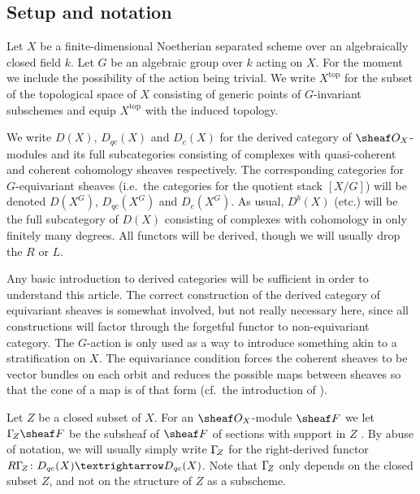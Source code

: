 \documentclass[english,biblatex-alpha]{short-notes}
\newcommand\lc[1]{\Gamma_{\mkern-3mu#1}}
\begin{document}
\subsection{Setup and notation}

Let $X$ be a finite-dimensional Noetherian separated scheme over an algebraically closed field $k$.
Let $G$ be an algebraic group over $k$ acting on $X$.
For the moment we include the possibility of the action being trivial.
We write $X^{\mathrm{top}}$ for the subset of the topological space of $X$ consisting of generic points of $G$-invariant subschemes and equip $X^{\mathrm{top}}$ with the induced topology.

We write $D(X)$, $D_{qc}(X)$ and $D_c(X)$ for the derived category of $\O_X$-modules and its full subcategories consisting of complexes with quasi-coherent and coherent cohomology sheaves respectively.
The corresponding categories for $G$-equivariant sheaves (i.e.\ the categories for the quotient stack $[X/G]$) will be denoted $D(X^G)$, $D_{qc}(X^G)$ and $D_c(X^G)$.
As usual, $D^b(X)$ (etc.) will be the full subcategory of $D(X)$ consisting of complexes with cohomology in only finitely many degrees.
All functors will be derived, though we will usually drop the $R$ or $L$.

\begin{cgs}
    Any basic introduction to derived categories will be sufficient in order to understand this article.
    The correct construction of the derived category of equivariant sheaves is somewhat involved, but not really necessary here, since all constructions will factor through the forgetful functor to non-equivariant category.
    The $G$-action is only used as a way to introduce something akin to a stratification on $X$.
    The equivariance condition forces the coherent sheaves to be vector bundles on each orbit and reduces the possible maps between sheaves so that the cone of a map is of that form (cf.~the introduction of \cite{ArinkinBezrukavnikov:arXiv:PerverseCoherentSheaves}).
\end{cgs}

Let $Z$ be a closed subset of $X$.
For an $\O_X$-module $\sheaf F$ we let $\lc Z\sheaf F$ be the subsheaf of $\sheaf F$ of sections with support in $Z$ \cite[Varition~3 in IV.1]{Hartshorne:1966:ResiduesAndDuality}.
By abuse of notation, we will usually simply write $\lc Z$ for the right-derived functor $R\lc Z\colon D_{qc}(X) → D_{qc}(X)$.
Note that $\lc Z$ only depends on the closed subset $Z$, and not on the structure of $Z$ as a subscheme.
\end{document}
